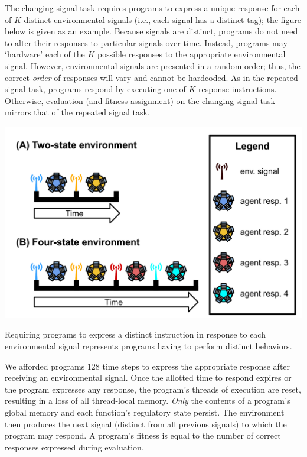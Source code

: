 \documentclass[
]{book}
\begin{document}
The changing-signal task requires programs to express a unique response for each of \(K\) distinct environmental signals (i.e., each signal has a distinct tag); the figure below is given as an example.
Because signals are distinct, programs do not need to alter their responses to particular signals over time.
Instead, programs may `hardware' each of the \(K\) possible responses to the appropriate environmental signal.
However, environmental signals are presented in a random order; thus, the correct \emph{order} of responses will vary and cannot be hardcoded.
As in the repeated signal task, programs respond by executing one of \(K\) response instructions.
Otherwise, evaluation (and fitness assignment) on the changing-signal task mirrors that of the repeated signal task.

\includegraphics{experiments/2020-11-11-chg-sig/analysis/../../../media/changing-signal-task.png}

Requiring programs to express a distinct instruction in response to each environmental signal represents programs having to perform distinct behaviors.

We afforded programs 128 time steps to express the appropriate response after receiving an environmental signal.
Once the allotted time to respond expires or the program expresses any response, the program's threads of execution are reset, resulting in a loss of all thread-local memory.
\emph{Only} the contents of a program's global memory and each function's regulatory state persist.
The environment then produces the next signal (distinct from all previous signals) to which the program may respond.
A program's fitness is equal to the number of correct responses expressed during evaluation.
\end{document}
